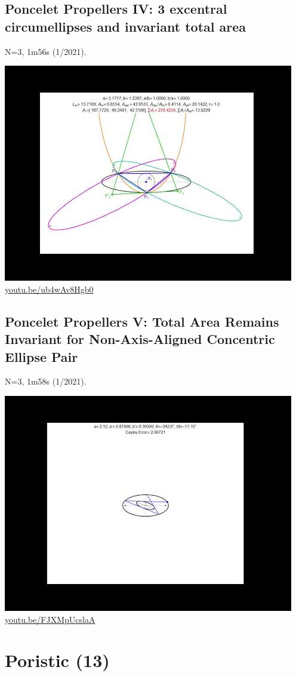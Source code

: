 \documentclass[12pt]{amsart}
\begin{document}
\subsection{Poncelet Propellers IV: 3 excentral circumellipses and invariant total area}
\label{vid:ub4wAv8Hgb0}
\noindent N=3, 1m56s (1/2021). 
\begin{center}\includegraphics[width=.5\textwidth]{pics/ub4wAv8Hgb0.jpg} \\ 
\href{https://youtu.be/ub4wAv8Hgb0}{\url{youtu.be/ub4wAv8Hgb0}}\end{center}
% 

\subsection{Poncelet Propellers V: Total Area Remains Invariant for Non-Axis-Aligned Concentric Ellipse Pair}
\label{vid:FJXMpUcslaA}
\noindent N=3, 1m58s (1/2021). 
\begin{center}\includegraphics[width=.5\textwidth]{pics/FJXMpUcslaA.jpg} \\ 
\href{https://youtu.be/FJXMpUcslaA}{\url{youtu.be/FJXMpUcslaA}}\end{center}
% 


\section{Poristic (13)}
\end{document}
